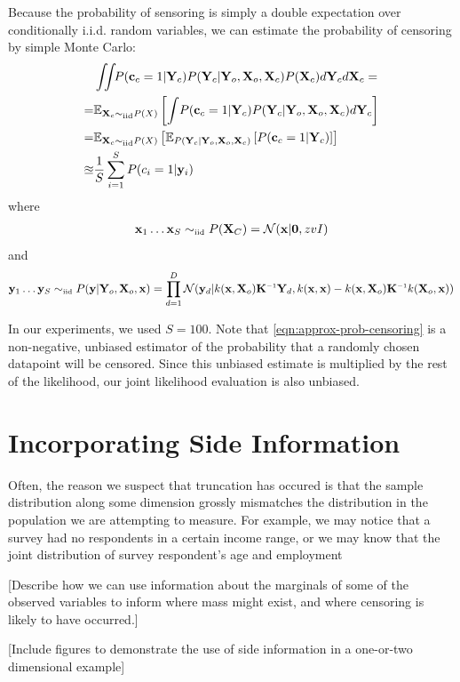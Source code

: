 \documentclass{article}
\begin{document}
Because the probability of sensoring is simply a double expectation over conditionally i.i.d. random variables, we can estimate the probability of censoring by simple Monte Carlo:
%
\begin{align}
& \intlatent P( \vc_c = 1 | \vY_c ) P( \vY_c | \vY_o, \vX_o, \vX_c) P(\vX_c) d\vY_c d\vX_c = \\
= & \expectargs{\vX_c \simiid P(X)}{\int \! P( \vc_c = 1 | \vY_c ) P( \vY_c | \vY_o, \vX_o, \vX_c) d\vY_c } \\
= & \expectargs{\vX_c \simiid P(X)}{\expectargs{ P( \vY_c | \vY_o, \vX_o, \vX_c) } {P( \vc_c = 1 | \vY_c ) }} \\
\approxeq & \frac{1}{S} \sum_{i=1}^S P(c_i = 1 | \vy_i )
\label{eqn:approx-prob-censoring}
\end{align}
%
where
%
\begin{align}
  \vx_1 \dots \vx_S \simiid P( \vX_C ) = \N{\vx}{ \vzero}{ zvI }
\end{align}
%
and
%
\begin{align}
 \vy_1 \dots \vy_S \simiid P(\vy | \vY_o, \vX_o, \vx) = \prod_{d=1}^D \N{\vy_d}{k(\vx, \vX_o) \vK\inv \vY_d}{k(\vx, \vx) - k(\vx, \vX_o) \vK\inv k(\vX_o, \vx)}
\end{align}

%
In our experiments, we used $S = 100$.  Note that \eqref{eqn:approx-prob-censoring} is a non-negative, unbiased estimator of the probability that a randomly chosen datapoint will be censored.  Since this unbiased estimate is multiplied by the rest of the likelihood, our joint likelihood evaluation is also unbiased.

\section{Incorporating Side Information}

Often, the reason we suspect that truncation has occured is that the sample distribution along some dimension grossly mismatches the distribution in the population we are attempting to measure.  For example, we may notice that a survey had no respondents in a certain income range, or we may know that the joint distribution of survey respondent's age and employment

[Describe how we can use information about the marginals of some of the observed variables to inform where mass might exist, and where censoring is likely to have occurred.]

[Include figures to demonstrate the use of side information in a one-or-two dimensional example]
\end{document}
